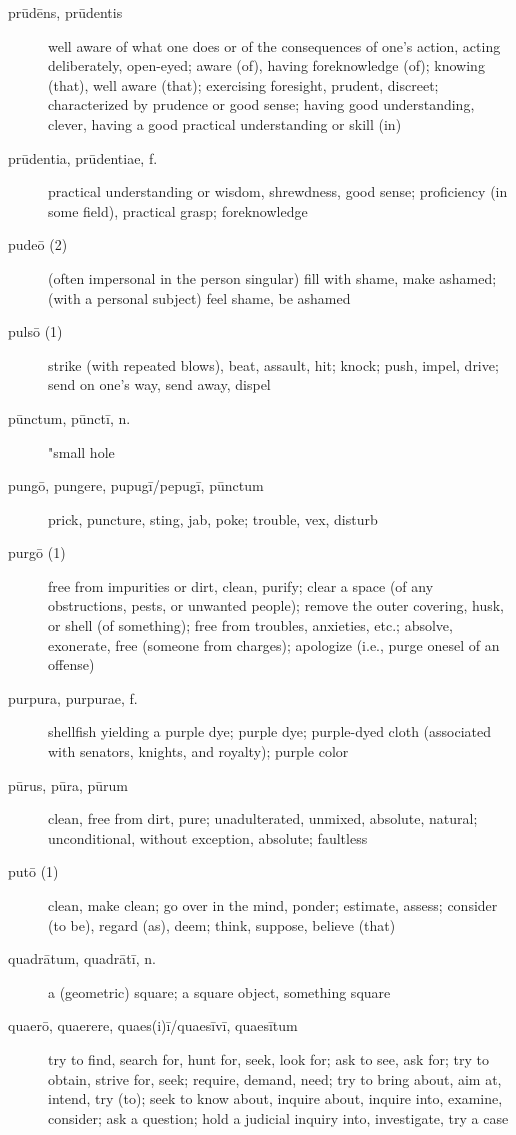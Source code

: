 \begin{description}
    \item[prūdēns, prūdentis] well aware of what one does or of the consequences of one's action, acting deliberately, open-eyed; aware (of), having foreknowledge (of); knowing (that), well aware (that); exercising foresight, prudent, discreet; characterized by prudence or good sense; having good understanding, clever, having a good practical understanding or skill (in)
    \item[prūdentia, prūdentiae, f.] practical understanding or wisdom, shrewdness, good sense; proficiency (in some field), practical grasp; foreknowledge
    \item[pudeō (2)] (often impersonal in the  person singular) fill with shame, make ashamed; (with a personal subject) feel shame, be ashamed
    \item[pulsō (1)] strike (with repeated blows), beat, assault, hit; knock; push, impel, drive; send on one's way, send away, dispel
    \item[pūnctum, pūnctī, n.]  "small hole
    \item[pungō, pungere, pupugī/pepugī, pūnctum] prick, puncture, sting, jab, poke; trouble, vex, disturb
    \item[purgō (1)] free from impurities or dirt, clean, purify; clear a space (of any obstructions, pests, or unwanted people); remove the outer covering, husk, or shell (of something); free from troubles, anxieties, etc.; absolve, exonerate, free (someone from charges); apologize (i.e., purge onesel of an offense)
    \item[purpura, purpurae, f.] shellfish yielding a purple dye; purple dye; purple-dyed cloth (associated with senators, knights, and royalty); purple color
    \item[pūrus, pūra, pūrum] clean, free from dirt, pure; unadulterated, unmixed, absolute, natural; unconditional, without exception, absolute; faultless
    \item[putō (1)] \marginnote{*}clean, make clean; go over in the mind, ponder; estimate, assess; consider (to be), regard (as), deem; think, suppose, believe (that)
    \item[quadrātum, quadrātī, n.] a (geometric) square; a square object, something square
    \item[quaerō, quaerere, quaes(i)ī/quaesīvī, quaesītum] \marginnote{*}try to find, search for, hunt for, seek, look for; ask to see, ask for; try to obtain, strive for, seek; require, demand, need; try to bring about, aim at, intend, try (to); seek to know about, inquire about, inquire into, examine, consider; ask a question; hold a judicial inquiry into, investigate, try a case

\end{description}
